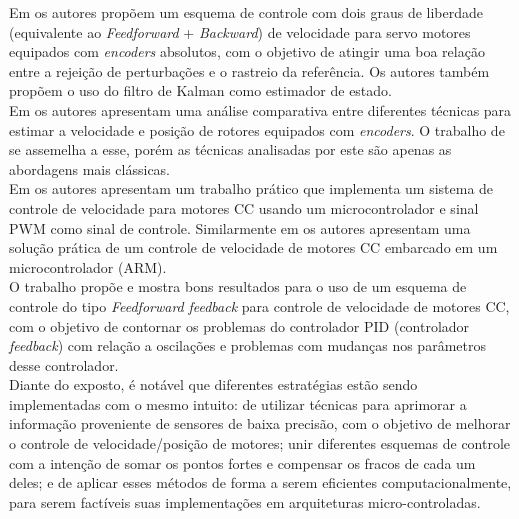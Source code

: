 Em \cite{TOF:PIControl} os autores propõem um esquema de controle com dois graus de liberdade (equivalente ao \emph{Feedforward} + \emph{Backward}) de velocidade para servo motores equipados com \emph{encoders} absolutos, com o objetivo de atingir uma boa relação entre a rejeição de perturbações e o rastreio da referência. Os autores também propõem o uso do filtro de Kalman como estimador de estado.\\

Em \cite{analise_incr_enc} os autores apresentam uma análise comparativa entre diferentes técnicas para estimar a velocidade e posição de rotores equipados com \emph{encoders}. O trabalho de \cite{quantization_error01} se assemelha a esse, porém as técnicas analisadas por este são apenas as abordagens mais clássicas.\\

Em \cite{pwm_control} os autores apresentam um trabalho prático que implementa um sistema de controle de velocidade para motores CC usando um microcontrolador e sinal PWM como sinal de controle. Similarmente em \cite{embedded_control} os autores apresentam uma solução prática de um controle de velocidade de motores CC embarcado em um microcontrolador (ARM).\\

O trabalho \cite{feedback_feedforward_control01} propõe e mostra bons resultados para o uso de um esquema de controle do tipo \emph{Feedforward} \emph{feedback} para controle de velocidade de motores CC, com o objetivo de contornar os problemas do controlador PID (controlador \emph{feedback}) com relação a oscilações e problemas com mudanças nos parâmetros desse controlador.\\

Diante do exposto, é notável que diferentes estratégias estão sendo implementadas com o mesmo intuito: de utilizar técnicas para aprimorar a informação proveniente de sensores de baixa precisão, com o objetivo de melhorar o controle de velocidade/posição de motores; unir diferentes esquemas de controle com a intenção de somar os pontos fortes e compensar os fracos de cada um deles; e de aplicar esses métodos de forma a serem eficientes computacionalmente, para serem factíveis suas implementações em arquiteturas micro-controladas.

